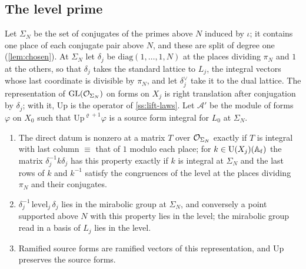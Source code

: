 \subsection{The level prime}\label{ss:level-prime}
Let $\Sigma_N$ be the set of conjugates of the primes above $N$ induced by $\iota$; it contains one place of each conjugate pair above $N$, and
these are split of degree one (\cref{lem:chosen}). At $\Sigma_N$ let $\delta_j$ be $\mathrm{diag}(1,\dots,1,N)$ at the places dividing $\pi_N$ and $1$ at
the others, so that $\delta_j$ takes the standard lattice to $L_j$, the integral vectors whose last coordinate is divisible by $\pi_N$, and let
$\delta^\vee_j$ take it to the dual lattice. The representation of $\operatorname{GL}(\mathcal{O}_{\Sigma_N})$ on forms on $X_j$ is right translation after conjugation
by $\delta_j$; with it, $\mathrm{Up}$ is the operator of \cref{ss:lift-laws}. Let $\mathcal A'$ be the module of forms $\varphi$ on $X_0$ such that
$\mathrm{Up}^{\varrho+1}\varphi$ is a source form integral for $L_0$ at $\Sigma_N$.

\begin{proposition}\label{prop:setup-N}
\begin{enumerate}[label=\textup{(\alph*)}]
\item The direct datum is nonzero at a matrix $T$ over $\mathcal{O}_{\Sigma_N}$ exactly if $T$ is integral with last column $\equiv$ that of $1$ modulo each place;
for $k\in\operatorname{U}(X_j)(\mathbb{A}_{\mathrm f})$ the matrix $\delta_j^{-1}k\delta_j$ has this property exactly if $k$ is integral at $\Sigma_N$ and the last rows of $k$ and $k^{-1}$
satisfy the congruences of the level at the places dividing $\pi_N$ and their conjugates.
\item $\delta_j^{-1}\,\mathrm{level}_j\,\delta_j$ lies in the mirabolic group at $\Sigma_N$, and conversely a point supported above $N$ with this property lies in the
level; the mirabolic group read in a basis of $L_j$ lies in the level.
\item Ramified source forms are ramified vectors of this representation, and $\mathrm{Up}$ preserves the source forms.
\end{enumerate}
\end{proposition}

